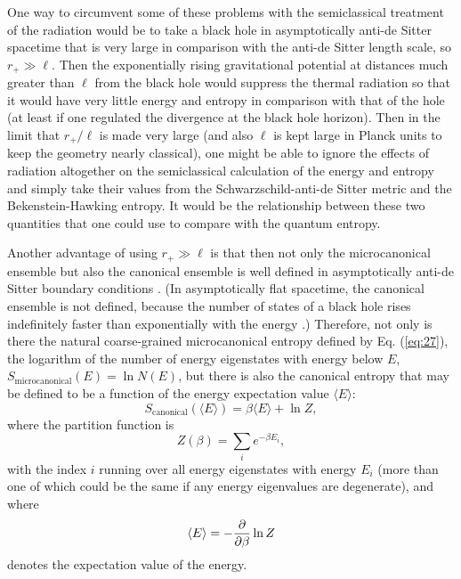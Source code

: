 \documentclass[12pt]{article} \usepackage{latexsym} \textwidth 15cm
\begin{document}
One way to circumvent some of these problems with the semiclassical
treatment of the radiation would be to take a black hole in
asymptotically anti-de Sitter spacetime that is very large in
comparison with the anti-de Sitter length scale, so $r_+ \gg \ell$. 
Then the exponentially rising gravitational potential at distances much
greater than $\ell$ from the black hole would suppress the thermal
radiation so that it would have very little energy and entropy in
comparison with that of the hole (at least if one regulated the
divergence at the black hole horizon).  Then in the limit that
$r_+/\ell$ is made very large (and also $\ell$ is kept large in Planck
units to keep the geometry nearly classical), one might be able to
ignore the effects of radiation altogether on the semiclassical
calculation of the energy and entropy and simply take their values from
the Schwarzschild-anti-de Sitter metric and the Bekenstein-Hawking
entropy.  It would be the relationship between these two quantities
that one could use to compare with the quantum entropy.

Another advantage of using $r_+ \gg \ell$ is that then not only the
microcanonical ensemble but also the canonical ensemble is well defined
in asymptotically anti-de Sitter boundary conditions \cite{HawPage}. 
(In asymptotically flat spacetime, the canonical ensemble is not
defined, because the number of states of a black hole rises
indefinitely faster than exponentially with the energy \cite{Haw3}.) 
Therefore, not only is there the natural coarse-grained microcanonical
entropy defined by Eq. (\ref{eq:27}), the logarithm of the number of
energy eigenstates with energy below $E$,
$S_{\mathrm{microcanonical}}(E) = \ln{N(E)}$, but there is also the
canonical entropy that may be defined to be a function of the
energy expectation value $\langle E \rangle$:
 \begin{equation}
 S_{\mathrm{canonical}}(\langle E \rangle)
  = \beta \langle E \rangle + \ln{Z},
 \label{eq:30}
 \end{equation}
where the partition function is
 \begin{equation}
 Z(\beta) = \sum_i e^{-\beta E_i},
 \label{eq:31}
 \end{equation}
with the index $i$ running over all energy eigenstates with energy $E_i$
(more than one of which could be the same if any energy eigenvalues are
degenerate), and where
 \begin{equation}
 \langle E \rangle = - {\partial\over \partial\beta} \ln{Z}
 \label{eq:32}
 \end{equation}
denotes the expectation value of the energy.
\end{document}
